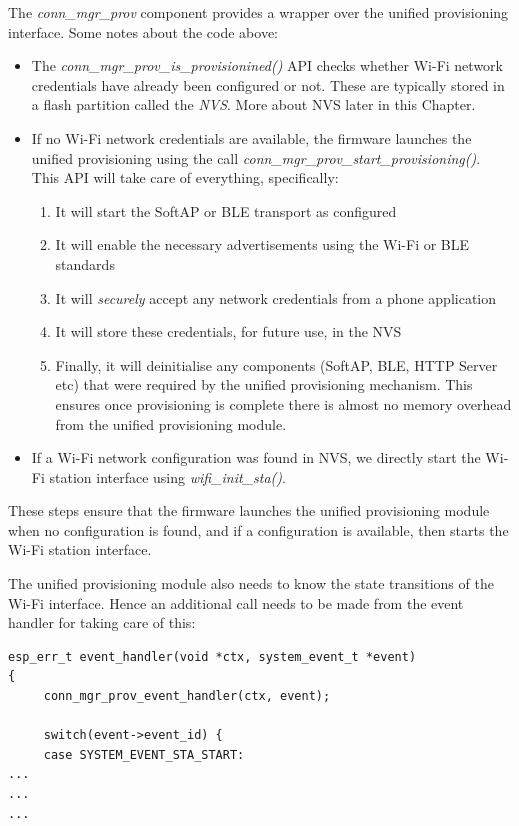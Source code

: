 \documentclass[main.tex]{subfiles}
\begin{document}
The \textit{conn\_mgr\_prov} component provides a wrapper over the unified provisioning interface. Some notes about the code above:
\begin{itemize}
    \item The \textit{conn\_mgr\_prov\_is\_provisionined()} API checks whether Wi-Fi network credentials have already been configured or not. These are typically stored in a flash partition called the \textit{NVS}. More about NVS later in this Chapter.
    \item If no Wi-Fi network credentials are available, the firmware launches the unified provisioning using the call \textit{conn\_mgr\_prov\_start\_provisioning()}. This API will take care of everything, specifically:
    \begin{enumerate}
        \item It will start the SoftAP or BLE transport as configured
        \item It will enable the necessary advertisements using the Wi-Fi or BLE standards
        \item It will \textit{securely} accept any network credentials from a phone application
        \item It will store these credentials, for future use, in the NVS
        \item Finally, it will deinitialise any components (SoftAP, BLE, HTTP Server etc) that were required by the unified provisioning mechanism. This ensures once provisioning is complete there is almost no memory overhead from the unified provisioning module.
    \end{enumerate}
    \item If a Wi-Fi network configuration was found in NVS, we directly start the Wi-Fi station interface using \textit{wifi\_init\_sta()}.
\end{itemize}

These steps ensure that the firmware launches the unified provisioning module when no configuration is found, and if a configuration is available, then starts the Wi-Fi station interface.

The unified provisioning module also needs to know the state transitions of the Wi-Fi interface. Hence an additional call needs to be made from the event handler for taking care of this:
\begin{verbatim}
esp_err_t event_handler(void *ctx, system_event_t *event)
{
     conn_mgr_prov_event_handler(ctx, event);
   
     switch(event->event_id) {
     case SYSTEM_EVENT_STA_START:
...
...
...
\end{verbatim}
\end{document}
